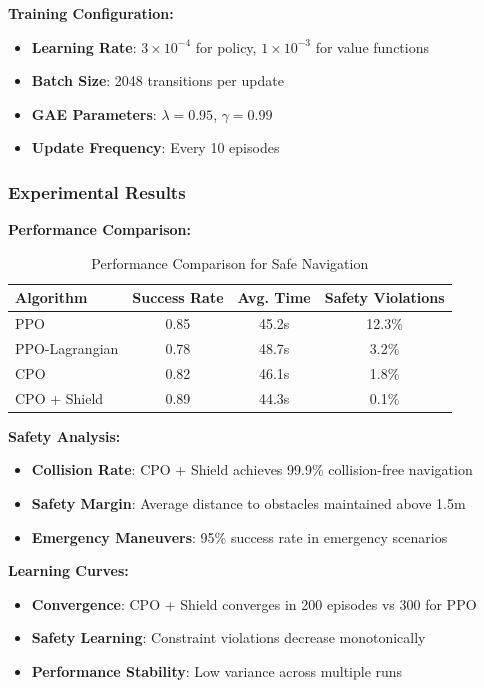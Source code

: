\documentclass[12pt]{article}
\begin{document}
{{{{\textbf{Training Configuration:}
\begin{itemize}
\item \textbf{Learning Rate}: $3 \times 10^{-4}$ for policy, $1 \times 10^{-3}$ for value functions
\item \textbf{Batch Size}: 2048 transitions per update
\item \textbf{GAE Parameters}: $\lambda = 0.95$, $\gamma = 0.99$
\item \textbf{Update Frequency}: Every 10 episodes
\end{itemize}

\subsubsection{Experimental Results}

\textbf{Performance Comparison:}
\begin{table}[H]
\centering
\caption{Performance Comparison for Safe Navigation}
\begin{tabular}{lccc}
\toprule
Algorithm & Success Rate & Avg. Time & Safety Violations \\
\midrule
PPO & 0.85 & 45.2s & 12.3\% \\
PPO-Lagrangian & 0.78 & 48.7s & 3.2\% \\
CPO & 0.82 & 46.1s & 1.8\% \\
CPO + Shield & 0.89 & 44.3s & 0.1\% \\
\bottomrule
\end{tabular}
\end{table}

\textbf{Safety Analysis:}
\begin{itemize}
\item \textbf{Collision Rate}: CPO + Shield achieves 99.9\% collision-free navigation
\item \textbf{Safety Margin}: Average distance to obstacles maintained above 1.5m
\item \textbf{Emergency Maneuvers}: 95\% success rate in emergency scenarios
\end{itemize}

\textbf{Learning Curves:}
\begin{itemize}
\item \textbf{Convergence}: CPO + Shield converges in 200 episodes vs 300 for PPO
\item \textbf{Safety Learning}: Constraint violations decrease monotonically
\item \textbf{Performance Stability}: Low variance across multiple runs
\end{itemize}

}}}}
\end{document}
